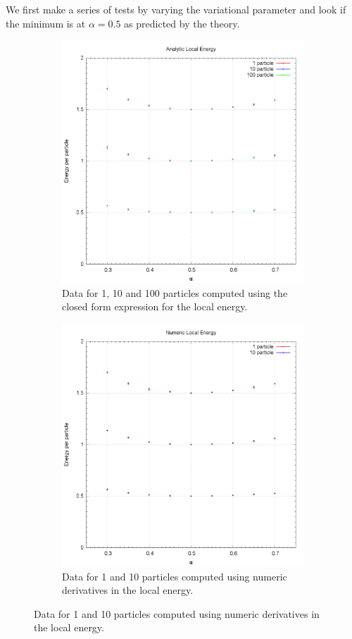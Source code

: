 \documentclass[10pt,a4paper,titlepage]{article}
\begin{document}
\noindent We first make a series of tests by varying the variational parameter and look if the minimum is at $\alpha=0.5$ as predicted by the theory.
\begin{center}
\begin{figure}[H]
 \centering
\begin{subfigure}{.5\textwidth}
  \centering
  \includegraphics[width=.9\linewidth]{plot_energy.png}
  \caption{Data for 1, 10 and 100 particles computed using the \\closed form expression for the local energy.}
  \label{fig:sfig2}
\end{subfigure}%
\begin{subfigure}{.5\textwidth}
  \centering
  \includegraphics[width=.9\linewidth]{plot_energy_num.png}
  \caption{\footnotesize Data for 1 and 10 particles computed using numeric derivatives in the local energy.}
  \label{fig:sfig2}
\end{subfigure}%


\end{figure}
\end{center}
\end{document}

